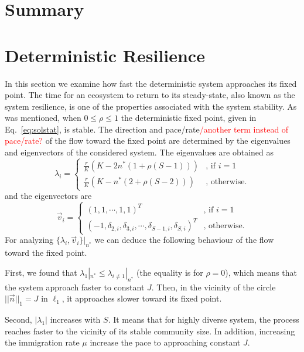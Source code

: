 \documentclass[%
 amsmath,amssymb,
reprint,%
linenumbers]{revtex4-2}
\begin{document}
\section{Summary}

 
 \iffalse
\section{Deterministic Resilience}

In this section we examine how fast the deterministic system approaches its fixed point. The time for an ecosystem to return to its steady-state, also known as the system resilience, is one of the properties associated with the system stability.   As was mentioned, when $0\leq \rho\leq 1$ the deterministic fixed point, given in Eq.~\eqref{eq:solstat}, is stable. The direction and pace/rate\textcolor{red}{/another term instead of pace/rate? } of the flow toward the fixed point are determined by the eigenvalues and eigenvectors of the considered system.  The eigenvalues are obtained as 
\begin{equation}
\lambda_i =
\begin{cases}
\frac{r}{K}\left( K - 2 n^*(1+\rho(S-1)) \right) & \text{, if } i=1 \\
\frac{r}{K}\left( K - n^*(2+\rho(S-2)) \right) & \text{, otherwise}.
\end{cases}
\end{equation}
and the eigenvectors are 
\begin{equation}
\vec{v}_i =
\begin{cases}
(1,1,\cdots,1,1)^T & \text{, if } i=1 \\
(-1,\delta_{2,i},\delta_{3,i},\cdots,\delta_{S-1,i},\delta_{S,i})^T & \text{, otherwise}.
\end{cases}
\end{equation}
For analyzing $\{\lambda_i,\vec{v}_i\}|_{n^*}$ we can deduce the following behaviour of the flow toward the fixed point.  

First, we found that $\lambda_1|_{n^*} \leq \lambda_{i\neq 1}|_{n^*}$ (the equality is for $\rho=0$), which means that the system approach faster to constant $J$. Then, in the vicinity of the circle $||\vec{n}||_1=J$ in $\ell_1$, it approaches slower toward its fixed point. 

Second, $|\lambda_1|$ increases with $S$. It means that for highly diverse system, the process reaches faster to the vicinity of its stable community size. In addition, increasing the immigration rate $\mu$ increase the pace to approaching constant $J$.   
\end{document}
